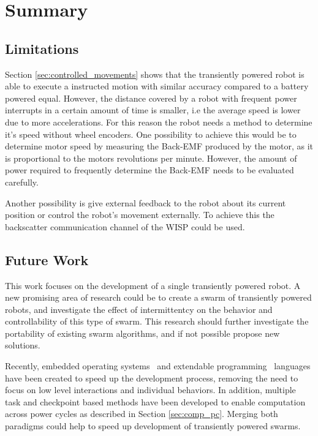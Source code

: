 \chapter{Summary}
\label{chp:summary}

\section{Limitations}


Section \ref{sec:controlled_movements} shows that the transiently powered robot is able to execute a instructed motion with similar accuracy compared to a battery powered equal.
However, the distance covered by a robot with frequent power interrupts in a certain amount of time is smaller, i.e the average speed is lower due to more accelerations.
For this reason the robot needs a method to determine it's speed without wheel encoders.
One possibility to achieve this would be to determine motor speed by measuring the Back-EMF produced by the motor, as it is proportional to the motors revolutions per minute. %
However, the amount of power required to frequently determine the Back-EMF needs to be evaluated carefully.

Another possibility is give external feedback to the robot about its current position or control the robot's movement externally.
To achieve this the backscatter communication channel of the WISP could be used.

\section{Future Work}

This work focuses on the development of a single transiently powered robot.
A new promising area of research could be to create a swarm of transiently powered robots, and investigate the effect of intermittentcy on the behavior and controllability of this type of swarm.
This research should further investigate the portability of existing swarm algorithms, and if not possible propose new solutions.	

Recently, embedded operating systems~\cite{trenkwalder_iros_2016} and extendable programming~\cite{pinciroli_iros_2016} languages have been created to speed up the development process, removing the need to focus on low level interactions and individual behaviors.
In addition, multiple task and checkpoint based methods have been developed to enable computation across power cycles as described in Section \ref{sec:comp_pc}.
Merging both paradigms could help to speed up development of transiently powered swarms.

